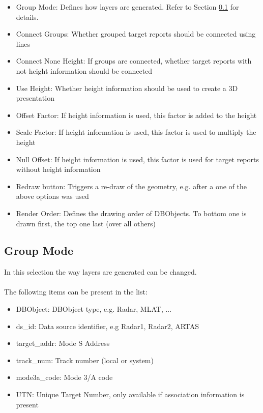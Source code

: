 \begin{itemize}
 \item Group Mode: Defines how layers are generated. Refer to Section \ref{sec:group_mode} for details.
 \item Connect Groups: Whether grouped target reports should be connected using lines
 \item Connect None Height: If groups are connected, whether target reports with not height information should be connected
 \item Use Height: Whether height information should be used to create a 3D presentation
 \item Offset Factor: If height information is used, this factor is added to the height
 \item Scale Factor: If height information is used, this factor is used to multiply the height
 \item Null Offset: If height information is used, this factor is used for target reports without height information
 \item Redraw button: Triggers a re-draw of the geometry, e.g. after a one of the above options was used
 \item Render Order: Defines the drawing order of DBObjects. To bottom one is drawn first, the top one last (over all others)
\end{itemize} 

\subsection{Group Mode}
\label{sec:group_mode}

In this selection the way layers are generated can be changed. \\\\

The following items can be present in the list:

\begin{itemize}
 \item DBObject: DBObject type, e.g. Radar, MLAT, ...
 \item ds\_id: Data source identifier, e.g Radar1, Radar2, ARTAS
 \item target\_addr: Mode S Address
 \item track\_num: Track number (local or system)
 \item mode3a\_code: Mode 3/A code
 \item UTN: Unique Target Number, only available if association information is present
\end{itemize}

